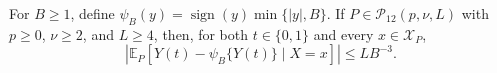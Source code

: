 For \(B\geq1\), define \(\psi_B(y)=\operatorname{sign}(y)\min\{|y|,B\}\).  If \(P\in\mathcal P_{12}(p,\nu,L)\) with \(p\geq0\), \(\nu\geq2\), and \(L\geq4\), then, for both \(t\in\{0,1\}\) and every \(x\in\mathcal X_P\),
\[
 \left|\mathbb E_P\!\left[Y(t)-\psi_B\{Y(t)\}\mid X=x\right]\right|
 \leq L B^{-3}.
\]